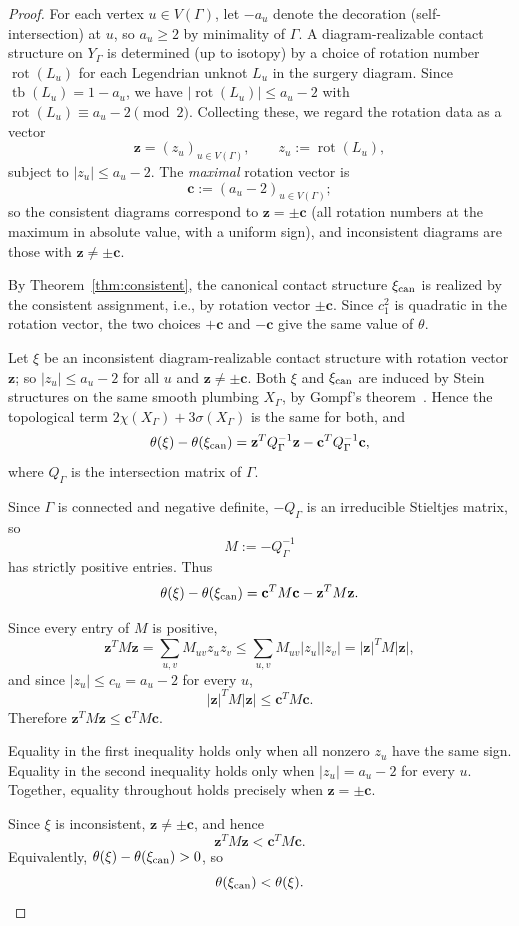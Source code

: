 \documentclass[11pt]{amsart}
\theoremstyle{plain}
\theoremstyle{definition}
\theoremstyle{remark}
\DeclareMathOperator\tb{tb}
\DeclareMathOperator\rot{rot}
\begin{document}
\begin{proof}
For each vertex $u\in V(\Gamma)$, let $-a_u$ denote the decoration
(self-intersection) at $u$, so $a_u\geq 2$ by minimality of $\Gamma$.
A diagram-realizable contact structure on $Y_\Gamma$ is determined
(up to isotopy) by a choice of rotation number $\rot(L_u)$ for each
Legendrian unknot $L_u$ in the surgery diagram. Since
$\tb(L_u)=1-a_u$, we have $|\rot(L_u)|\leq a_u-2$ with
$\rot(L_u)\equiv a_u-2\pmod{2}$. Collecting these, we regard the
rotation data as a vector
\[
\mathbf{z}=(z_u)_{u\in V(\Gamma)},\qquad z_u:=\rot(L_u),
\]
subject to $|z_u|\leq a_u-2$. The \emph{maximal} rotation vector is
\[
\mathbf{c}:=(a_u-2)_{u\in V(\Gamma)};
\]
so the consistent diagrams correspond to $\mathbf{z}=\pm\mathbf{c}$
(all rotation numbers at the maximum in absolute value, with a
uniform sign), and inconsistent diagrams are those with
$\mathbf{z}\neq\pm\mathbf{c}$.

By Theorem~\ref{thm:consistent}, the canonical contact structure
$\xi_{\rm can}$ is realized by the consistent assignment, i.e.,
by rotation vector $\pm\mathbf{c}$. Since $c_1^2$ is quadratic in the
rotation vector, the two choices $+\mathbf{c}$ and $-\mathbf{c}$ give
the same value of $\theta$.

Let $\xi$ be an inconsistent diagram-realizable contact structure
with rotation vector $\mathbf{z}$; so $|z_u|\leq a_u-2$ for all $u$
and $\mathbf{z}\neq\pm\mathbf{c}$. Both $\xi$ and
$\xi_{\rm can}$ are induced by Stein structures on the same
smooth plumbing $X_\Gamma$, by Gompf's
theorem~\cite[Theorem~2.1]{Gompf98}. Hence the topological term
$2\chi(X_\Gamma)+3\sigma(X_\Gamma)$ is the same for both, and
\[
\theta(\xi)-\theta(\xi_{\rm can})
=\mathbf{z}^TQ_\Gamma^{-1}\mathbf{z}-\mathbf{c}^TQ_\Gamma^{-1}\mathbf{c},
\]
where $Q_\Gamma$ is the intersection matrix of $\Gamma$.

Since $\Gamma$ is connected and negative definite, $-Q_\Gamma$ is an
irreducible Stieltjes matrix, so
\[
M:=-Q_\Gamma^{-1}
\]
has strictly positive entries. Thus
\[
\theta(\xi)-\theta(\xi_{\rm can})
=\mathbf{c}^TM\mathbf{c}-\mathbf{z}^TM\mathbf{z}.
\]

Since every entry of $M$ is positive,
\[
\mathbf{z}^TM\mathbf{z}
=\sum_{u,v}M_{uv}z_u z_v
\leq\sum_{u,v}M_{uv}|z_u||z_v|
=|\mathbf{z}|^TM|\mathbf{z}|,
\]
and since $|z_u|\leq c_u=a_u-2$ for every $u$,
\[
|\mathbf{z}|^TM|\mathbf{z}|\leq\mathbf{c}^TM\mathbf{c}.
\]
Therefore $\mathbf{z}^TM\mathbf{z}\leq\mathbf{c}^TM\mathbf{c}$.

Equality in the first inequality holds only when all nonzero $z_u$
have the same sign. Equality in the second inequality holds only
when $|z_u|=a_u-2$ for every $u$. Together, equality throughout
holds precisely when $\mathbf{z}=\pm\mathbf{c}$.

Since $\xi$ is inconsistent, $\mathbf{z}\neq\pm\mathbf{c}$, and hence
\[
\mathbf{z}^TM\mathbf{z}<\mathbf{c}^TM\mathbf{c}.
\]
Equivalently, $\theta(\xi)-\theta(\xi_{\rm can})>0$, so
\[
\theta(\xi_{\rm can})<\theta(\xi).
\]
\end{proof}
\end{document}
